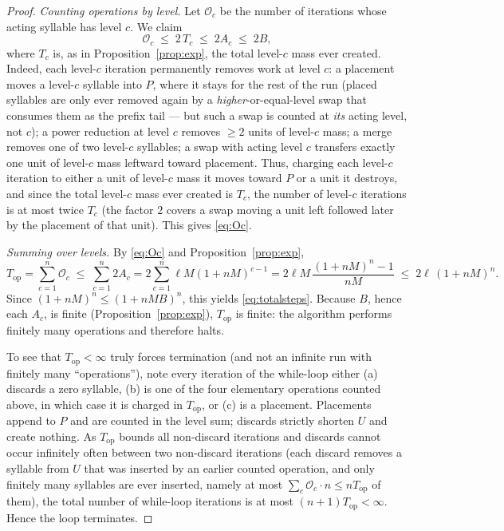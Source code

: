 \documentclass{amsart}
\theoremstyle{definition}
\begin{document}
\begin{proof}
\emph{Counting operations by level.} Let $\mathcal O_c$ be the number of iterations whose
acting syllable has level $c$. We claim
\begin{equation}\label{eq:Oc}
\mathcal O_c\;\le\; 2\,T_c\;\le\;2A_c\;\le\;2B,
\end{equation}
where $T_c$ is, as in Proposition~\ref{prop:exp}, the total level-$c$ mass ever created.
Indeed, each level-$c$ iteration permanently removes work at level $c$: a placement moves a
level-$c$ syllable into $P$, where it stays for the rest of the run (placed syllables are only
ever removed again by a \emph{higher}-or-equal-level swap that consumes them as the prefix tail
— but such a swap is counted at \emph{its} acting level, not $c$); a power reduction at level
$c$ removes $\ge2$ units of level-$c$ mass; a merge removes one of two level-$c$ syllables; a
swap with acting level $c$ transfers exactly one unit of level-$c$ mass leftward toward
placement. Thus, charging each level-$c$ iteration to either a unit of level-$c$ mass it moves
toward $P$ or a unit it destroys, and since the total level-$c$ mass ever created is $T_c$,
the number of level-$c$ iterations is at most twice $T_c$ (the factor $2$ covers a swap moving
a unit left followed later by the placement of that unit). This gives \eqref{eq:Oc}.

\emph{Summing over levels.} By \eqref{eq:Oc} and Proposition~\ref{prop:exp},
\[
T_{\mathrm{op}}=\sum_{c=1}^{n}\mathcal O_c\;\le\;\sum_{c=1}^{n}2A_c
=2\sum_{c=1}^{n}\ell M(1+nM)^{c-1}
=2\ell M\,\frac{(1+nM)^{n}-1}{nM}
\;\le\;2\ell\,(1+nM)^{n}.
\]
Since $(1+nM)^n\le(1+nMB)^n$, this yields \eqref{eq:totalsteps}. Because $B$, hence each $A_c$,
is finite (Proposition~\ref{prop:exp}), $T_{\mathrm{op}}$ is finite: the algorithm performs
finitely many operations and therefore halts.

To see that $T_{\mathrm{op}}<\infty$ truly forces termination (and not an infinite run with
finitely many ``operations''), note every iteration of the while-loop either (a) discards a
zero syllable, (b) is one of the four elementary operations counted above, in which case it is
charged in $T_{\mathrm{op}}$, or (c) is a placement. Placements append to $P$ and are counted
in the level sum; discards strictly shorten $U$ and create nothing. As $T_{\mathrm{op}}$ bounds
all non-discard iterations and discards cannot occur infinitely often between two non-discard
iterations (each discard removes a syllable from $U$ that was inserted by an earlier counted
operation, and only finitely many syllables are ever inserted, namely at most
$\sum_c \mathcal O_c\cdot n\le nT_{\mathrm{op}}$ of them), the total number of while-loop
iterations is at most $(n+1)T_{\mathrm{op}}<\infty$. Hence the loop terminates.


\end{proof}
\end{document}
